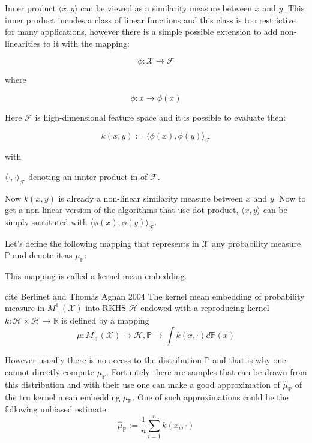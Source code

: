 Inner product $\langle x, y \rangle$ can be viewed as a similarity measure between $x$ and $y$. This inner product incudes a class of linear functions and this class is too restrictive for many applications, however there is a simple possible extension to add non-linearities to it with the mapping:

\begin{equation}
    \phi: \mathcal{X} \rightarrow \mathcal{F}
\end{equation}

where

\begin{equation}
    \phi: x \rightarrow \phi(x)
    \label{equation:positive-definite}
\end{equation}

Here $\mathcal{F}$ is high-dimensional feature space and it is possible to evaluate then:

\begin{equation}
    k(x, y) := {\langle\phi(x), \phi(y)\rangle}_{\mathcal{F}}
\end{equation}

with 

${\langle \cdot, \cdot \rangle}_{\mathcal{F}}$ denoting an innter product in of $\mathcal{F}$.

Now $ k(x, y)$ is already a non-linear similarity measure between $x$ and $y$. Now to get a non-linear version of the algorithms that use dot product, $\langle x, y\rangle$ can be simply sustituted with $ {\langle\phi(x), \phi(y)\rangle}_{\mathcal{F}}$. 

Let's define the following mapping that represents in $\mathcal{X}$ any probability measure $\mathds{P}$ and denote it as $\mu_{\mathds{P}}$:


This mapping is called a kernel mean embedding.

\begin{definition}
    cite Berlinet and Thomas Agnan 2004
    The kernel mean embedding of probability measure in $M^1_+(\mathcal{X})$ into RKHS $\mathscr{H}$ endowed with a reproducing kernel $k: \mathscr{H} \times \mathscr{H} \rightarrow \mathds{R}$ is defined by a mapping 
    \begin{equation}
        \mu : M^1_+(\mathcal{X}) \rightarrow \mathscr{H}, \mathds{P} \rightarrow \int k(x, \cdot)d\mathds{P}(x)
    \end{equation}
\end{definition}

However usually there is no access to the distribution $\mathds{P}$ and that is why one cannot directly compute $\mu_{\mathds{P}}$. Fortuntely there are samples that can be drawn from this distribution and with their use one can make a good approximation of $\hat{\mu}_{\mathds{P}}$ of the tru kernel mean embedding $\mu_{\mathds{P}}$. One of such approximations could be the following unbiased estimate:
\begin{equation}
    \hat{\mu}_{\mathds{P}} := \frac{1}{n} \sum_{i=1}^n k(x_i, \cdot)
\end{equation}

